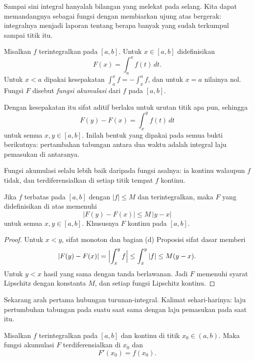 Sampai sini integral hanyalah bilangan yang melekat pada selang. Kita dapat
memandangnya sebagai fungsi dengan membiarkan ujung atas bergerak: integralnya menjadi
laporan tentang berapa banyak yang sudah terkumpul sampai titik itu.

\begin{definisi}
Misalkan $f$ terintegralkan pada $[a,b]$. Untuk $x\in[a,b]$ didefinisikan
\[
F(x)=\int_a^x f(t)\,dt .
\]
Untuk $x<a$ dipakai kesepakatan $\int_a^x f=-\int_x^a f$, dan untuk $x=a$ nilainya
nol. Fungsi $F$ disebut \emph{fungsi akumulasi} dari $f$ pada $[a,b]$.
\end{definisi}

Dengan kesepakatan itu sifat aditif berlaku untuk urutan titik apa pun, sehingga
\begin{equation}
F(y)-F(x)=\int_x^{y} f(t)\,dt
\end{equation}
untuk semua $x,y\in[a,b]$. Inilah bentuk yang dipakai pada semua bukti berikutnya:
pertambahan tabungan antara dua waktu adalah integral laju pemasukan di antaranya.

Fungsi akumulasi selalu lebih baik daripada fungsi asalnya: ia kontinu walaupun $f$
tidak, dan terdiferensialkan di setiap titik tempat $f$ kontinu.

\begin{proposisi}
Jika $f$ terbatas pada $[a,b]$ dengan $|f|\le M$ dan terintegralkan, maka $F$ yang
didefinisikan di atas memenuhi
\[
|F(y)-F(x)|\le M\,|y-x|
\]
untuk semua $x,y\in[a,b]$. Khususnya $F$ kontinu pada $[a,b]$.
\end{proposisi}

\begin{proof}
Untuk $x<y$, sifat monoton dan bagian (d) Proposisi sifat dasar memberi
\[
|F(y)-F(x)|=\Bigl|\int_x^{y}f\Bigr|\le\int_x^{y}|f|\le M(y-x).
\]
Untuk $y<x$ hasil yang sama dengan tanda berlawanan. Jadi $F$ memenuhi syarat
Lipschitz dengan konstanta $M$, dan setiap fungsi Lipschitz kontinu.
\end{proof}

Sekarang arah pertama hubungan turunan-integral. Kalimat sehari-harinya: laju
pertumbuhan tabungan pada suatu saat sama dengan laju pemasukan pada saat itu.

\begin{teorema}
Misalkan $f$ terintegralkan pada $[a,b]$ dan kontinu di titik $x_0\in(a,b)$. Maka
fungsi akumulasi $F$ terdiferensialkan di $x_0$ dan
\[
F'(x_0)=f(x_0).
\]
\end{teorema}


